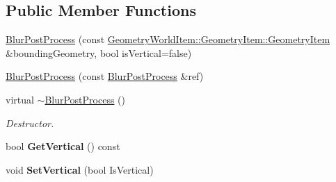 \subsection*{Public Member Functions}
\begin{DoxyCompactItemize}
\item 
\mbox{\hyperlink{class_geometry_engine_1_1_geometry_post_process_1_1_double_pass_post_process_1_1_blur_post_process_a256525f871c7c9c05e04f9ea511afac3}{Blur\+Post\+Process}} (const \mbox{\hyperlink{class_geometry_engine_1_1_geometry_world_item_1_1_geometry_item_1_1_geometry_item}{Geometry\+World\+Item\+::\+Geometry\+Item\+::\+Geometry\+Item}} \&bounding\+Geometry, bool is\+Vertical=false)
\item 
\mbox{\hyperlink{class_geometry_engine_1_1_geometry_post_process_1_1_double_pass_post_process_1_1_blur_post_process_a5f65c74239f5bd31149d92a5f3617f32}{Blur\+Post\+Process}} (const \mbox{\hyperlink{class_geometry_engine_1_1_geometry_post_process_1_1_double_pass_post_process_1_1_blur_post_process}{Blur\+Post\+Process}} \&ref)
\item 
\mbox{\label{class_geometry_engine_1_1_geometry_post_process_1_1_double_pass_post_process_1_1_blur_post_process_a0803bdceb234cf50cba7003528afecbc}} 
virtual \mbox{\hyperlink{class_geometry_engine_1_1_geometry_post_process_1_1_double_pass_post_process_1_1_blur_post_process_a0803bdceb234cf50cba7003528afecbc}{$\sim$\+Blur\+Post\+Process}} ()
\begin{DoxyCompactList}\small\item\em Destructor. \end{DoxyCompactList}\item 
\mbox{\label{class_geometry_engine_1_1_geometry_post_process_1_1_double_pass_post_process_1_1_blur_post_process_a9aae8307cd4d5d5305df8a99f93b2b5a}} 
bool {\bfseries Get\+Vertical} () const
\item 
\mbox{\label{class_geometry_engine_1_1_geometry_post_process_1_1_double_pass_post_process_1_1_blur_post_process_a7bff47bcf8bdb4ab877014d8187a8bfc}} 
void {\bfseries Set\+Vertical} (bool Is\+Vertical)
\item 

\end{DoxyCompactItemize}
